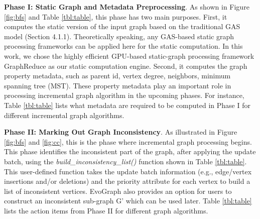 \textbf{Phase I: Static Graph and Metadata Preprocessing}. As shown in Figure \ref{fig:bfs} and Table \ref{tbl:table}, this phase has two main purposes. First, it computes the static version of the input graph based on the traditional GAS model (Section 4.1.1). Theoretically speaking, any GAS-based static graph processing frameworks can be applied here for the static computation. In this work, we chose the highly efficient GPU-based static-graph processing framework GraphReduce as our static computation engine. Second, it computes the graph property metadata, such as parent id, vertex degree, neighbors, minimum spanning tree (MST). These property metadata play an important role in processing incremental graph algorithm in the upcoming phases. For instance, Table \ref{tbl:table} lists what metadata are required to be computed in Phase I for different incremental graph algorithms.  




\textbf{Phase II: Marking Out Graph Inconsistency}. As illustrated in Figure \ref{fig:bfs} and \ref{fig:cc}, this is the phase where incremental graph processing begins. This phase identifies the inconsistent part of the graph, after applying the update batch, using the \textit{build\_inconsistency\_list()} function shown in Table \ref{tbl:table}. This user-defined function takes the update batch information (e.g., edge/vertex insertions and/or deletions) and the priority attribute for each vertex to build a list of inconsistent vertices. EvoGraph also provides an option for users to construct an inconsistent sub-graph G' which can be used later. Table \ref{tbl:table} lists the action items from Phase II for different graph algorithms.  

